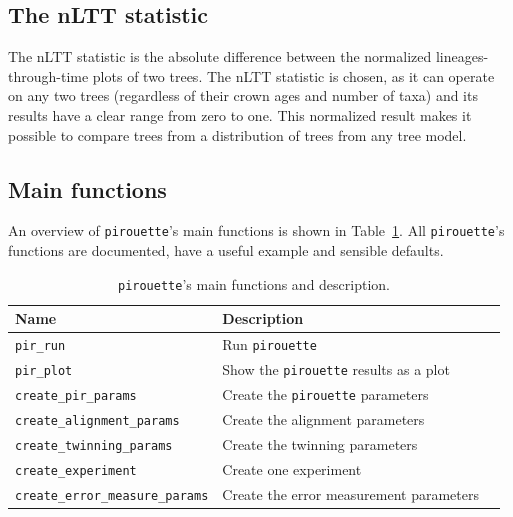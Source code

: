 \subsection{The nLTT statistic}
\label{subsec:nltt}

The nLTT statistic is the absolute difference
between the normalized lineages-through-time plots of two trees.
The nLTT statistic is chosen, as it can operate on any two trees (regardless
of their crown ages and number of taxa) and its results have a clear range
from zero to one. This normalized result makes it possible to compare trees 
from a distribution of trees from any tree model.

\subsection{Main functions}
\label{subsec:main_functions}

An overview of \verb;pirouette;'s main functions is shown in 
Table~\ref{tab:functions}. 
All \verb;pirouette;'s functions are documented,
have a useful example and sensible defaults.

\begin{table}[h]
  \centering
  \begin{tabular}{ | l | l | l | }
    \hline
    \textbf{Name} & \textbf{Description} \\
    \hline
    \verb;pir_run; & Run \verb;pirouette; \\
    \verb;pir_plot; & Show the \verb;pirouette; results as a plot  \\
    \verb;create_pir_params; & Create the \verb;pirouette; parameters  \\
    \hline
    \verb;create_alignment_params; & Create the alignment parameters  \\
    \verb;create_twinning_params; & Create the twinning parameters  \\
    \verb;create_experiment; & Create one experiment  \\
    \verb;create_error_measure_params; & Create the error measurement parameters  \\
    \hline
  \end{tabular}
  \caption{
    \texttt{pirouette}'s main functions and description. 
  }
  \label{tab:functions}
\end{table}

